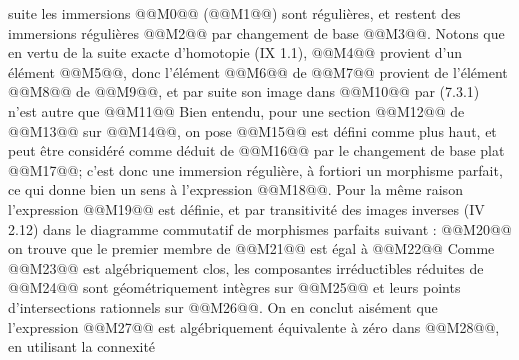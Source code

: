 
suite les immersions @@M0@@ (@@M1@@) sont régulières, et restent des immersions régulières @@M2@@ par changement de base @@M3@@. Notons que en vertu de la suite exacte d'homotopie (IX 1.1), @@M4@@ provient d'un élément @@M5@@, donc l'élément @@M6@@ de @@M7@@ provient de l'élément @@M8@@ de @@M9@@, et par suite son image dans @@M10@@ par (7.3.1) n'est autre que
@@M11@@
Bien entendu, pour une section @@M12@@ de @@M13@@ sur @@M14@@, on pose
@@M15@@
est défini comme plus haut, et peut être considéré comme déduit de @@M16@@ par le changement de base plat @@M17@@; c'est donc une immersion régulière, à fortiori un morphisme parfait, ce qui donne bien un sens à l'expression @@M18@@. Pour la même raison l'expression @@M19@@ est définie, et par transitivité des images inverses (IV 2.12) dans le diagramme commutatif de morphismes parfaits suivant :
@@M20@@
on trouve que le premier membre de @@M21@@ est égal à
@@M22@@
Comme @@M23@@ est algébriquement clos, les composantes irréductibles réduites de @@M24@@ sont géométriquement intègres sur @@M25@@ et leurs points d'intersections rationnels sur @@M26@@. On en conclut aisément que l'expression @@M27@@ est algébriquement équivalente à zéro dans @@M28@@, en utilisant la connexité
